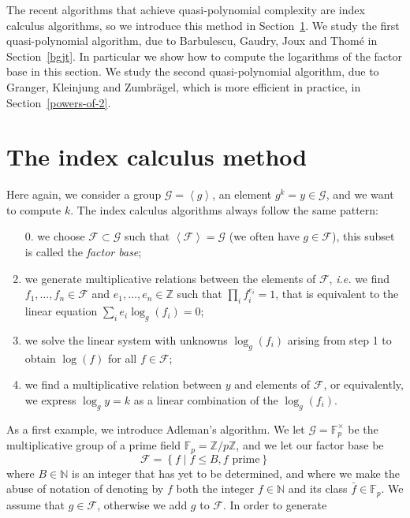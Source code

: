 \documentclass[a4paper,11pt]{article}
\theoremstyle{break}
\theoremstyle{sc}
\theoremstyle{definition}
\theoremstyle{remark}
\newcommand{\ie}{\emph{i.e. }}
\begin{document}
The recent algorithms that achieve quasi-polynomial complexity are index
calculus algorithms, so we introduce this method in
Section~\ref{index-calculus}. We study the first quasi-polynomial algorithm, due to
Barbulescu, Gaudry, Joux and Thomé in Section~\ref{bgjt}. In particular we show
how to compute the logarithms of the factor base in this section. We study the
second quasi-polynomial algorithm, due to Granger, Kleinjung and Zumbrägel,
which is more efficient in practice, in Section~\ref{powers-of-2}.

\section{The index calculus method}
\label{index-calculus}

Here again, we consider a group $\mathcal G=\left\langle g \right\rangle$, an element
$g^k = y\in \mathcal G$, and we want to compute $k$. The index calculus algorithms always
follow the same pattern:
\begin{enumerate}
  \item[0.] we choose $\mathcal F\subset \mathcal G$ such that $\left\langle
    \mathcal F \right\rangle = \mathcal G$
    (we often have $g\in \mathcal F$), this subset is called the \emph{factor base};
  \item we generate multiplicative relations between the elements of $\mathcal F$, \ie we
    find $f_1, \dots, f_n \in \mathcal F$ and $e_1, \dots, e_n\in \mathbb{Z}$ such that
    $\prod_i f_i^{e_i} = 1$, that is equivalent to the linear equation $\sum_i
    e_i\log_g(f_i) = 0$;
  \item we solve the linear system with unknowns $\log_g(f_i)$ arising from step
    1 to obtain $\log(f)$ for all $f\in \mathcal F$;
  \item we find a multiplicative relation between $y$ and elements of $\mathcal F$, or
    equivalently, we express $\log_g y = k$ as a linear combination of the
  $\log_g(f_i)$.
\end{enumerate}
As a first example, we introduce Adleman's algorithm. We let $\mathcal
G=\mathbb{F}_p^\times$ be the multiplicative group of a prime field
$\mathbb{F}_p=\mathbb{Z}/p\mathbb{Z}$, and we let our factor base be 
\[
  \mathcal F =\left\{ f\;|\;f\leq B, f\text{ prime} \right\}
\]
where $B\in \mathbb{N}$ is an integer that has yet to be determined, and where
we make the abuse of notation of denoting by $f$ both the integer
$f\in\mathbb{N}$ and its class $\bar f\in\mathbb{F}_p$. We assume that
$g\in\mathcal F$, otherwise we add $g$ to $\mathcal F$. In order to generate
\end{document}
